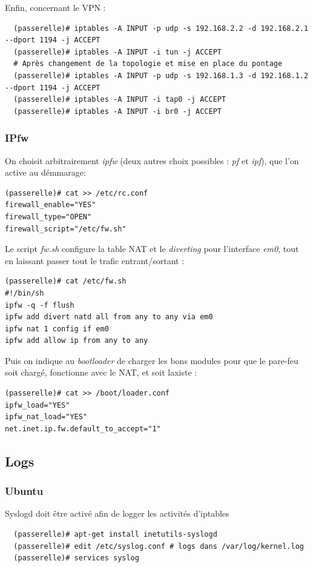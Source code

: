 \documentclass[a4paper]{article}
\begin{document}
Enfin, concernant le VPN :
\begin{verbatim}
  (passerelle)# iptables -A INPUT -p udp -s 192.168.2.2 -d 192.168.2.1 --dport 1194 -j ACCEPT
  (passerelle)# iptables -A INPUT -i tun -j ACCEPT
  # Après changement de la topologie et mise en place du pontage
  (passerelle)# iptables -A INPUT -p udp -s 192.168.1.3 -d 192.168.1.2 --dport 1194 -j ACCEPT
  (passerelle)# iptables -A INPUT -i tap0 -j ACCEPT
  (passerelle)# iptables -A INPUT -i br0 -j ACCEPT
\end{verbatim}

\subsubsection{IPfw}
On choisit arbitrairement \textit{ipfw} (deux autres choix possibles : \textit{pf} et \textit{ipf}),
que l'on active au démmarage:
\begin{verbatim}
(passerelle)# cat >> /etc/rc.conf
firewall_enable="YES"
firewall_type="OPEN"
firewall_script="/etc/fw.sh"
\end{verbatim}

Le script \textit{fw.sh} configure la table NAT et le \textit{diverting} pour l'interface
\textit{em0}, tout en laissant passer tout le trafic entrant/sortant :
\begin{verbatim}
(passerelle)# cat /etc/fw.sh 
#!/bin/sh
ipfw -q -f flush
ipfw add divert natd all from any to any via em0
ipfw nat 1 config if em0
ipfw add allow ip from any to any
\end{verbatim}

Puis on indique au \textit{bootloader} de charger les bons modules pour que
le pare-feu soit chargé, fonctionne avec le NAT, et soit laxiste :
\begin{verbatim}
(passerelle)# cat >> /boot/loader.conf
ipfw_load="YES"
ipfw_nat_load="YES"
net.inet.ip.fw.default_to_accept="1"
\end{verbatim}
\subsection{Logs}
\subsubsection{Ubuntu}
Syslogd doit être activé afin de logger les activités d'iptables

\begin{verbatim}
  (passerelle)# apt-get install inetutils-syslogd
  (passerelle)# edit /etc/syslog.conf # logs dans /var/log/kernel.log
  (passerelle)# services syslog
\end{verbatim}
\end{document}
